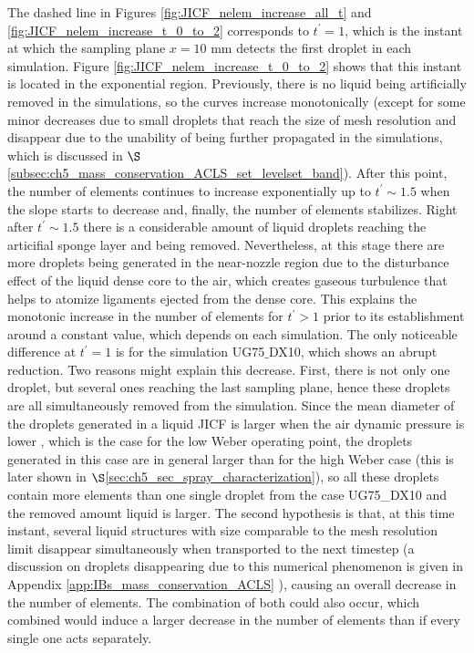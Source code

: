 The dashed line in Figures \ref{fig:JICF_nelem_increase_all_t} and  \ref{fig:JICF_nelem_increase_t_0_to_2} corresponds  to $t^{\prime} = 1$, which is the instant at which the sampling plane $x = 10$ mm detects the first droplet in each simulation. Figure \ref{fig:JICF_nelem_increase_t_0_to_2} shows that this instant is located in the exponential region. Previously, there is no liquid being artificially removed in the simulations, so the curves increase monotonically (except for some minor decreases due to small droplets that reach the size of mesh resolution and disappear due to the unability of being further propagated in the simulations, which is discussed in $\S$\ref{subsec:ch5_mass_conservation_ACLS_set_levelset_band}). After this point, the number of elements continues to increase exponentially up to $t^{\prime} \sim 1.5$ when the slope starts to decrease and, finally, the number of elements  stabilizes. Right after $t^{\prime} \sim 1.5$ there is a considerable amount of liquid droplets reaching the articifial sponge layer and being removed. Nevertheless, at this stage there are more droplets being generated in the near-nozzle region due to the disturbance effect of the liquid dense core to the air, which creates gaseous turbulence that helps to atomize ligaments ejected from the dense core. This explains the monotonic increase in the number of elements for $t^{\prime} > 1$ prior to its establishment around a constant value, which depends on each simulation. The only noticeable difference at $t^{\prime} = 1$ is for the simulation UG75$\_$DX10, which shows an abrupt reduction. Two reasons might explain this decrease. First, there is not only one droplet, but several ones reaching the last sampling plane, hence these droplets are all simultaneously removed from the simulation. Since the mean diameter of the droplets generated in a liquid JICF is larger when the air dynamic pressure is lower , which is the case for the low Weber operating point, the droplets generated in this case are in general larger than for the high Weber case (this is later shown in $\S$\ref{sec:ch5_sec_spray_characterization}), so all these droplets contain more elements than one single droplet from the case UG75\_DX10 and the removed amount liquid is larger. The second hypothesis is that, at this time instant, several liquid structures with size comparable to the mesh resolution limit disappear simultaneously when transported to the next timestep (a discussion on droplets disappearing due to this numerical phenomenon is given in Appendix \ref{app:IBs_mass_conservation_ACLS}
), causing an overall decrease in the number of elements. The combination of both could also occur, which combined would induce a larger decrease in the number of elements than if every single one acts separately.


